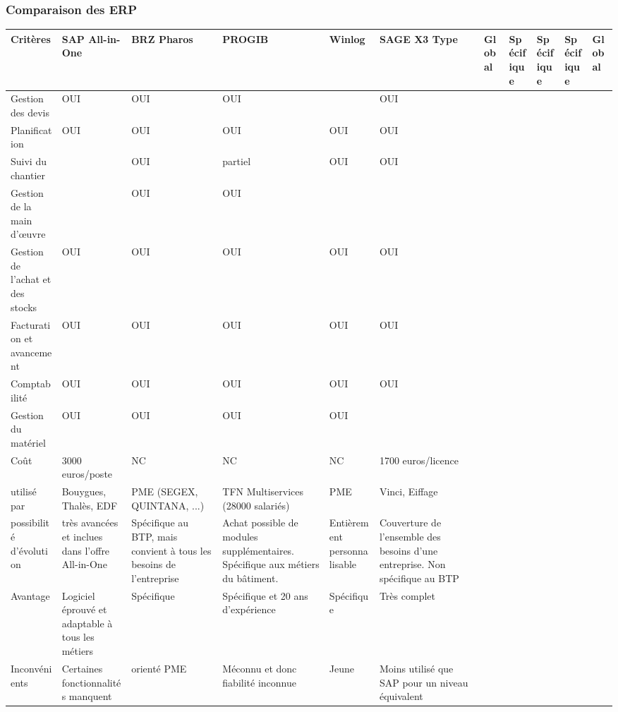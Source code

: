 \pagebreak
\subsubsection{Comparaison des ERP}

\hskip -15mm
\begin{longtable}{|m{2cm}|m{25mm}|m{25mm}|m{25mm}|m{25mm}|m{25mm}|}
\hline
Critères&SAP All-in-One&BRZ Pharos&PROGIB&Winlog&SAGE X3\endhead
\hline
Type&Global&Spécifique&Spécifique&Spécifique&Global\\
\hline
Gestion des devis&OUI&OUI&OUI&&OUI\\
\hline
Planification &OUI&OUI&OUI&OUI&OUI\\
\hline
Suivi du chantier&&OUI&partiel&OUI&OUI\\
\hline
Gestion de la main d’œuvre&&OUI&OUI&&\\
\hline
Gestion de l’achat et des stocks&OUI&OUI&OUI&OUI&OUI\\
\hline
Facturation et avancement&OUI&OUI&OUI&OUI&OUI\\
\hline
Comptabilité&OUI&OUI&OUI&OUI&OUI\\
\hline
Gestion du matériel&OUI&OUI&OUI&OUI&\\
\hline
Coût&3000 euros/poste&NC&NC&NC&1700 euros/licence\\
\hline
utilisé par&Bouygues, Thalès, EDF&PME (SEGEX, QUINTANA, ...)
&TFN Multiservices (28000 salariés)&PME&Vinci, Eiffage\\
\hline
possibilité d'évolution&très avancées et inclues dans l'offre All-in-One
&Spécifique au BTP, mais convient à tous les besoins de l'entreprise
&Achat possible de modules supplémentaires.
Spécifique aux métiers du bâtiment.
&Entièrement personnalisable&Couverture de l'ensemble des besoins
d'une entreprise. Non spécifique au BTP\\
\hline
Avantage&Logiciel éprouvé et adaptable à tous les métiers&Spécifique
&Spécifique et 20 ans d'expérience&Spécifique&Très complet\\
\hline
Inconvénients&Certaines fonctionnalités manquent&orienté PME
&Méconnu et donc fiabilité inconnue&Jeune
&Moins utilisé que SAP pour un niveau équivalent\\
\hline
\end{longtable}

